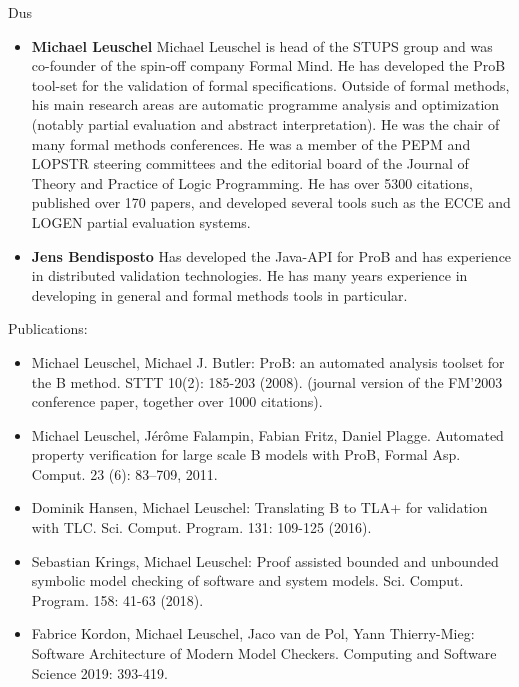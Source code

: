 \begin{sitedescription}{Dus}
\begin{itemize}
\item
\textbf{Michael Leuschel}
Michael Leuschel is head of the STUPS group and was co-founder of the spin-off
company Formal Mind.
He has developed the ProB tool-set for the validation of formal specifications.
Outside of formal methods, his main research areas are automatic programme analysis and optimization (notably partial evaluation and abstract interpretation).
He was the chair of many formal methods conferences.
He was a member of the PEPM and LOPSTR steering committees and
 the editorial board of the Journal of Theory and Practice of Logic Programming.
He has over 5300 citations, published over 170 papers, 
and developed several tools such as the ECCE and LOGEN partial evaluation systems.

\item
\textbf{Jens Bendisposto}
Has developed the Java-API for ProB and has experience in distributed validation technologies.
He has many years experience in developing in general and formal methods tools in particular.
\end{itemize}


Publications:
\begin{itemize}
\item Michael Leuschel, Michael J. Butler: ProB: an automated analysis toolset for the B method. STTT 10(2): 185-203 (2008).
 (journal version of the FM'2003 conference paper, together over 1000 citations).
\item Michael Leuschel, J{\'e}r{\^o}me Falampin, Fabian Fritz, Daniel Plagge.
Automated property verification for large scale {B} models with {ProB},
Formal Asp. Comput. 23 (6): 83--709, 2011.
\item Dominik Hansen, Michael Leuschel: Translating B to TLA+ for validation with TLC. Sci. Comput. Program. 131: 109-125 (2016).
\item Sebastian Krings, Michael Leuschel:
Proof assisted bounded and unbounded symbolic model checking of software and system models. Sci. Comput. Program. 158: 41-63 (2018).
\item Fabrice Kordon, Michael Leuschel, Jaco van de Pol, Yann Thierry-Mieg:
Software Architecture of Modern Model Checkers. Computing and Software Science 2019: 393-419.
\end{itemize}


\end{sitedescription}

